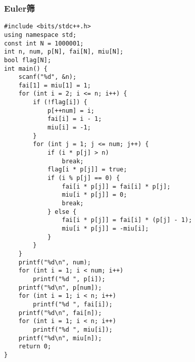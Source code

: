 \documentclass[a4paper]{article}
\begin{document}
\subsubsection{Euler筛}
\begin{lstlisting}
#include <bits/stdc++.h>
using namespace std;
const int N = 1000001;
int n, num, p[N], fai[N], miu[N];
bool flag[N];
int main() {
    scanf("%d", &n);
    fai[1] = miu[1] = 1;
    for (int i = 2; i <= n; i++) {
        if (!flag[i]) {
            p[++num] = i;
            fai[i] = i - 1;
            miu[i] = -1;
        }
        for (int j = 1; j <= num; j++) {
            if (i * p[j] > n)
                break;
            flag[i * p[j]] = true;
            if (i % p[j] == 0) {
                fai[i * p[j]] = fai[i] * p[j];
                miu[i * p[j]] = 0;
                break;
            } else {
                fai[i * p[j]] = fai[i] * (p[j] - 1);
                miu[i * p[j]] = -miu[i];
            }
        }
    }
    printf("%d\n", num);
    for (int i = 1; i < num; i++)
        printf("%d ", p[i]);
    printf("%d\n", p[num]);
    for (int i = 1; i < n; i++)
        printf("%d ", fai[i]);
    printf("%d\n", fai[n]);
    for (int i = 1; i < n; i++)
        printf("%d ", miu[i]);
    printf("%d\n", miu[n]);
    return 0;
}
\end{lstlisting}
\end{document}
